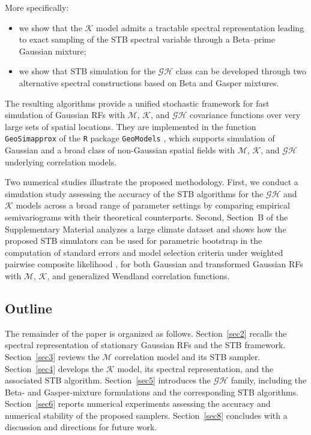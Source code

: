 \documentclass[
  12pt]{article}
\begin{document}
More specifically:
\begin{itemize}
\item we show that the $\mathcal{K}$ model admits a tractable spectral representation leading to exact sampling of the STB spectral variable through a Beta--prime Gaussian mixture;
\item we show that STB simulation for the $\mathcal{GH}$ class can be developed through two alternative spectral constructions based on Beta and Gasper mixtures.
\end{itemize}

The resulting algorithms provide a unified stochastic framework for fast simulation of Gaussian RFs with $\mathcal{M}$, $\mathcal{K}$, and $\mathcal{GH}$ covariance functions over very large sets of spatial locations.
They are implemented in the function \texttt{GeoSimapprox} of the \texttt{R} package \texttt{GeoModels} \citep{geomodels}, which supports simulation of Gaussian and a broad class of non-Gaussian spatial fields with $\mathcal{M}$, $\mathcal{K}$, and $\mathcal{GH}$ underlying correlation models.

Two numerical studies illustrate the proposed methodology.
First, we conduct a simulation study assessing the accuracy of the STB algorithms for the $\mathcal{GH}$ and $\mathcal{K}$ models across a broad range of parameter settings by comparing empirical semivariograms with their theoretical counterparts.
Second, Section~B of the Supplementary Material analyzes a large climate dataset and shows how the proposed STB simulators can be used for parametric bootstrap in the computation of standard errors and model selection criteria under weighted pairwise composite likelihood \citep{NNP}, for both Gaussian and transformed Gaussian RFs with $\mathcal{M}$, $\mathcal{K}$, and generalized Wendland correlation functions.

\subsection{Outline}

The remainder of the paper is organized as follows.
Section~\ref{sec2} recalls the spectral representation of stationary Gaussian RFs and the STB framework.
Section~\ref{sec3} reviews the $\mathcal{M}$ correlation model and its STB sampler.
Section~\ref{sec4} develops the $\mathcal{K}$ model, its spectral representation, and the associated STB algorithm.
Section~\ref{sec5} introduces the $\mathcal{GH}$ family, including the Beta- and Gasper-mixture formulations and the corresponding STB algorithms.
Section~\ref{sec6} reports numerical experiments assessing the accuracy and numerical stability of the proposed samplers.
Section~\ref{sec8} concludes with a discussion and directions for future work.
\end{document}
